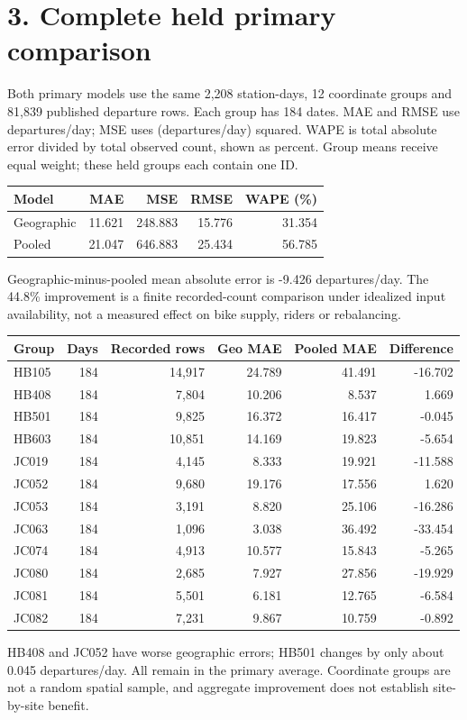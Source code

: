\documentclass[11pt]{article}
\begin{document}
\newpage\section*{3. Complete held primary comparison}
Both primary models use the same 2,208 station-days, 12 coordinate groups and 81,839 published departure rows. Each group has 184 dates. MAE and RMSE use departures/day; MSE uses (departures/day) squared. WAPE is total absolute error divided by total observed count, shown as percent. Group means receive equal weight; these held groups each contain one ID.

\begin{center}\small\setlength{\tabcolsep}{4pt}
\begin{tabular}{lrrrr}\toprule
Model & MAE & MSE & RMSE & WAPE (\%) \\
\midrule
Geographic & 11.621 & 248.883 & 15.776 & 31.354 \\
Pooled & 21.047 & 646.883 & 25.434 & 56.785 \\
\bottomrule\end{tabular}\end{center}
Geographic-minus-pooled mean absolute error is -9.426 departures/day. The 44.8\% improvement is a finite recorded-count comparison under idealized input availability, not a measured effect on bike supply, riders or rebalancing.

\begin{center}\small\setlength{\tabcolsep}{4pt}
\begin{tabular}{lrrrrr}\toprule
Group & Days & Recorded rows & Geo MAE & Pooled MAE & Difference \\
\midrule
HB105 & 184 & 14,917 & 24.789 & 41.491 & -16.702 \\
HB408 & 184 & 7,804 & 10.206 & 8.537 & 1.669 \\
HB501 & 184 & 9,825 & 16.372 & 16.417 & -0.045 \\
HB603 & 184 & 10,851 & 14.169 & 19.823 & -5.654 \\
JC019 & 184 & 4,145 & 8.333 & 19.921 & -11.588 \\
JC052 & 184 & 9,680 & 19.176 & 17.556 & 1.620 \\
JC053 & 184 & 3,191 & 8.820 & 25.106 & -16.286 \\
JC063 & 184 & 1,096 & 3.038 & 36.492 & -33.454 \\
JC074 & 184 & 4,913 & 10.577 & 15.843 & -5.265 \\
JC080 & 184 & 2,685 & 7.927 & 27.856 & -19.929 \\
JC081 & 184 & 5,501 & 6.181 & 12.765 & -6.584 \\
JC082 & 184 & 7,231 & 9.867 & 10.759 & -0.892 \\
\bottomrule\end{tabular}\end{center}
HB408 and JC052 have worse geographic errors; HB501 changes by only about 0.045 departures/day. All remain in the primary average. Coordinate groups are not a random spatial sample, and aggregate improvement does not establish site-by-site benefit.
\end{document}
